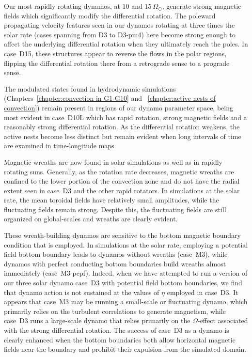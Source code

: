 Our most rapidly rotating dynamos, at $10$ and $15\: \Omega_\odot$, 
generate strong magnetic fields which significantly modify the differential rotation.  The
poleward propagating velocity features seen in our dynamos rotating at
three times the solar rate (cases spanning from D3 to D3-pm4) here become strong enough to
affect the underlying differential rotation when they ultimately reach
the poles.  In case~D15, these structures appear to reverse 
the flows in the polar regions, flipping the differential rotation
there from a retrograde sense to a prograde sense.  

The modulated states found in hydrodynamic simulations 
(Chapters~\ref{chapter:convection in G1-G10} and ~\ref{chapter:active
  nests of convection}) remain present in regions of our dynamo
parameter space, being most evident in case~D10L which has rapid
rotation, strong magnetic fields and a reasonably strong differential rotation. 
As the differential rotation weakens, the active nests become less
distinct but remain evident when long intervals of time are examined
in time-longitude maps.

Magnetic wreaths are now found in solar simulations as well as in
rapidly rotating suns.  Generally, as the rotation rate decreases,
magnetic wreaths are confined to the lower portion of the convection
zone and do not have the radial extent seen in case~D3 and the other
rapid rotators.  In simulations at the solar rate, the mean toroidal
fields have relatively small amplitudes, while the fluctuating fields
remain strong.  Despite this, the fluctuating fields are still
organized on global-scales and wreaths  are clearly evident.

 These wreath-building dynamos are sensitive to the bottom magnetic boundary
 condition that is employed.  In simulations at the solar rate,
 employing a potential field bottom boundary leads to dynamos without
 wreaths (case~M3), while dynamos with perfect conducting bottom
 boundaries build wreaths almost immediately (case~M3-pcpf).
 Indeed, when we have attempted to run a version of our three solar
 dynamo case~D3 with potential field bottom boundaries, we find that
 dynamo action is not sustained at the values of $\eta$ employed in case~D3.
 It appears that case~M3 may be running a small-scale or fluctuating
 dynamo, which primarily relies on the turbulent correlations to
 generate magnetism, while case~D3 runs a large-scale dynamo that
 relies primarily on the $\Omega$-effect associated with the strong
 differential rotation.  The success of case~D3 as a dynamo is clearly
 enhanced when the bottom boundaries both allow horizontal magnetic
 fields near the boundary and prohibit their expulsion from the
 simulated domain. 


